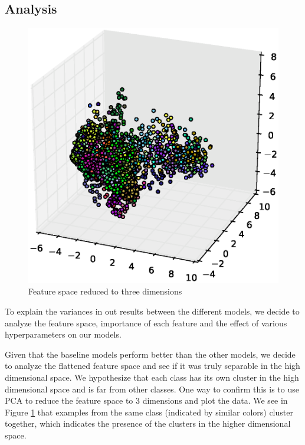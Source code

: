 \documentclass[twocolumn]{article}
\begin{document}
\subsection{Analysis}
\begin{figure}[h]
    \centering
    \includegraphics[trim=100 40 80 80, clip, width=0.8\linewidth]{results/feature_space}
    \caption{Feature space reduced to three dimensions}
    \label{fig:feature_space}
\end{figure}


To explain the variances in out results between the different models, we decide to analyze the feature space, importance of each feature and the effect of various hyperparameters on our models. 

Given that the baseline models perform better than the other models, we decide to analyze the flattened feature space and see if it was truly separable in the high dimensional space.  We hypothesize that each class has its own cluster in the high dimensional space and is far from other classes. One way to confirm this is to use PCA to reduce the feature space to 3 dimensions and plot the data. We see in Figure \ref{fig:feature_space} that examples from the same class (indicated by similar colors) cluster together, which indicates the presence of the clusters in the higher dimensional space. 
\end{document}
